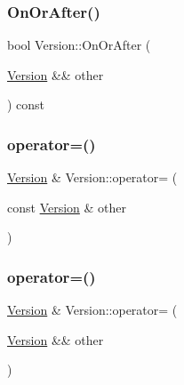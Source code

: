 \subsubsection{\texorpdfstring{On\+Or\+After()}{OnOrAfter()}\hspace{0.1cm}{\footnotesize\ttfamily [2/2]}}
{\footnotesize\ttfamily bool Version\+::\+On\+Or\+After (\begin{DoxyParamCaption}\item[{\mbox{\hyperlink{classlucene_1_1core_1_1util_1_1etc_1_1Version}{Version}} \&\&}]{other }\end{DoxyParamCaption}) const}

\mbox{\label{classlucene_1_1core_1_1util_1_1etc_1_1Version_acadb681698bff09f325e17475cdb10d3}} 
\subsubsection{\texorpdfstring{operator=()}{operator=()}\hspace{0.1cm}{\footnotesize\ttfamily [1/2]}}
{\footnotesize\ttfamily \mbox{\hyperlink{classlucene_1_1core_1_1util_1_1etc_1_1Version}{Version}} \& Version\+::operator= (\begin{DoxyParamCaption}\item[{const \mbox{\hyperlink{classlucene_1_1core_1_1util_1_1etc_1_1Version}{Version}} \&}]{other }\end{DoxyParamCaption})}

\mbox{\label{classlucene_1_1core_1_1util_1_1etc_1_1Version_a80e6e12eb42ef093474810a0289b6eb2}} 
\subsubsection{\texorpdfstring{operator=()}{operator=()}\hspace{0.1cm}{\footnotesize\ttfamily [2/2]}}
{\footnotesize\ttfamily \mbox{\hyperlink{classlucene_1_1core_1_1util_1_1etc_1_1Version}{Version}} \& Version\+::operator= (\begin{DoxyParamCaption}\item[{\mbox{\hyperlink{classlucene_1_1core_1_1util_1_1etc_1_1Version}{Version}} \&\&}]{other }\end{DoxyParamCaption})}

